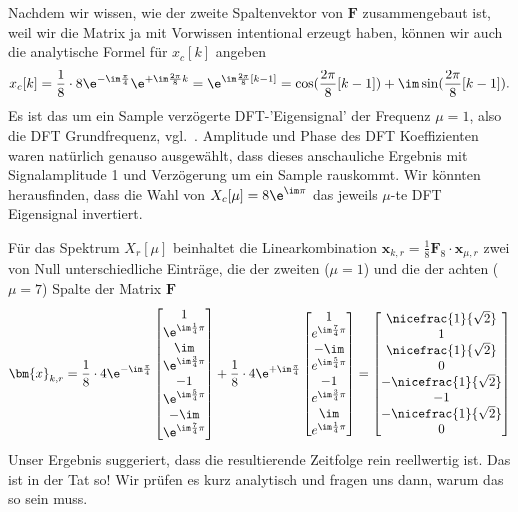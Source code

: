 \begin{ExCalc}
%
Nachdem wir wissen, wie der zweite Spaltenvektor von $\bm{F}$ zusammengebaut
ist, weil wir die Matrix ja mit Vorwissen intentional erzeugt haben, können wir
auch die analytische Formel für $x_c[k]$ angeben
\begin{align}
x_c[k] = \frac{1}{8} \cdot 8 \e^{-\im\frac{\pi}{4}} \e^{+\im\frac{2\pi}{8} k}=
\e^{\im \frac{2\pi}{8} [k -1] } =
\cos(\frac{2\pi}{8} [k-1]) + \im \sin(\frac{2\pi}{8} [k-1]).
\end{align}
Es ist das um ein Sample verzögerte DFT-'Eigensignal' der Frequenz $\mu=1$, also
die DFT Grundfrequenz, vgl.~.
Amplitude und Phase des DFT Koeffizienten waren
natürlich genauso ausgewählt, dass dieses anschauliche Ergebnis mit
Signalamplitude 1 und Verzögerung um ein Sample rauskommt. Wir könnten
herausfinden, dass die Wahl von $X_c[\mu] = 8\e^{\im\pi}$ das jeweils $\mu$-te DFT Eigensignal
invertiert.

Für das Spektrum $X_r[\mu]$ beinhaltet die Linearkombination $\bm{x}_{k,r}  =
\frac{1}{8} \bm{F}_8 \cdot \bm{x}_{\mu,r}$ zwei von Null unterschiedliche
Einträge, die der zweiten ($\mu=1$) und die der achten ($\mu=7$)
Spalte der Matrix $\bm{F}$
\begin{align}
\bm{x}_{k,r} = \frac{1}{8} \cdot 4 \e^{-\im\frac{\pi}{4}}
\begin{bmatrix}
1 \\  \e^{\im\frac{1}{4}\pi} \\ \im \\ \e^{\im\frac{3}{4}\pi}  \\ -1 \\ \e^{\im\frac{5}{4}\pi} \\ -\im \\ \e^{\im\frac{7}{4}\pi}
\end{bmatrix}
+
\frac{1}{8} \cdot 4 \e^{+\im\frac{\pi}{4}}
\begin{bmatrix}
1 \\ e^{\im\frac{7}{4}\pi} \\ -\im \\ e^{\im\frac{5}{4}\pi} \\ -1 \\ e^{\im\frac{3}{4}\pi} \\ \im \\ e^{\im\frac{1}{4}\pi}
\end{bmatrix}
=
\begin{bmatrix}
\nicefrac{1}{\sqrt{2}}\\
1\\
\nicefrac{1}{\sqrt{2}}\\
0\\
-\nicefrac{1}{\sqrt{2}}\\
-1\\
-\nicefrac{1}{\sqrt{2}}\\
0
\end{bmatrix}
\end{align}
Unser Ergebnis suggeriert, dass die resultierende Zeitfolge rein reellwertig ist.
Das ist in der Tat so! Wir prüfen es kurz analytisch und fragen uns dann, warum
das so sein muss.


\end{ExCalc}
